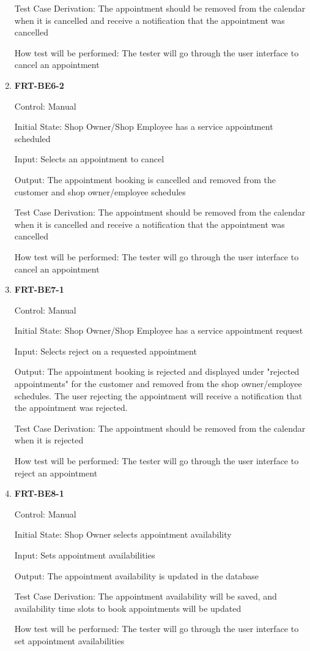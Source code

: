 \documentclass[12pt, titlepage]{article}
\begin{document}
\begin{enumerate}
	      Test Case Derivation: The appointment should be removed from the calendar when it is cancelled and
	      receive a notification that the appointment was cancelled

	      How test will be performed: The tester will go through the user interface to cancel an appointment

	\item \textbf{FRT-BE6-2}

	      Control: Manual

	      Initial State: Shop Owner/Shop Employee has a service appointment scheduled

	      Input: Selects an appointment to cancel

	      Output: The appointment booking is cancelled and removed from the customer and shop owner/employee
	      schedules

	      Test Case Derivation: The appointment should be removed from the calendar when it is cancelled and
	      receive a notification that the appointment was cancelled

	      How test will be performed: The tester will go through the user interface to cancel an appointment

	\item \textbf{FRT-BE7-1}

	      Control: Manual

	      Initial State: Shop Owner/Shop Employee has a service appointment request

	      Input: Selects reject on a requested appointment

	      Output: The appointment booking is rejected and displayed under "rejected appointments" for the
	      customer and removed from the shop owner/employee schedules. The user rejecting the appointment
	      will receive a notification that the appointment was rejected.

	      Test Case Derivation: The appointment should be removed from the calendar when it is rejected

	      How test will be performed: The tester will go through the user interface to reject an appointment

	\item \textbf{FRT-BE8-1}

	      Control: Manual

	      Initial State: Shop Owner selects appointment availability

	      Input: Sets appointment availabilities

	      Output: The appointment availability is updated in the database

	      Test Case Derivation: The appointment availability will be saved, and availability time slots to
	      book appointments will be updated

	      How test will be performed: The tester will go through the user interface to set appointment
	      availabilities
\end{enumerate}
\end{document}
